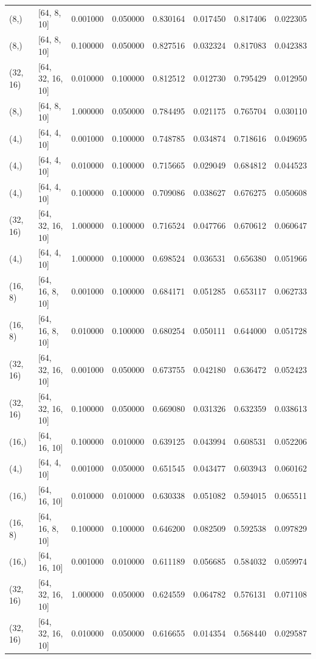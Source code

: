 \documentclass{article}
\begin{document}
\begin{longtable}{llrrrrrr}
(8,) & [64, 8, 10] & 0.001000 & 0.050000 & 0.830164 & 0.017450 & 0.817406 & 0.022305 \\
(8,) & [64, 8, 10] & 0.100000 & 0.050000 & 0.827516 & 0.032324 & 0.817083 & 0.042383 \\
(32, 16) & [64, 32, 16, 10] & 0.010000 & 0.100000 & 0.812512 & 0.012730 & 0.795429 & 0.012950 \\
(8,) & [64, 8, 10] & 1.000000 & 0.050000 & 0.784495 & 0.021175 & 0.765704 & 0.030110 \\
(4,) & [64, 4, 10] & 0.001000 & 0.100000 & 0.748785 & 0.034874 & 0.718616 & 0.049695 \\
(4,) & [64, 4, 10] & 0.010000 & 0.100000 & 0.715665 & 0.029049 & 0.684812 & 0.044523 \\
(4,) & [64, 4, 10] & 0.100000 & 0.100000 & 0.709086 & 0.038627 & 0.676275 & 0.050608 \\
(32, 16) & [64, 32, 16, 10] & 1.000000 & 0.100000 & 0.716524 & 0.047766 & 0.670612 & 0.060647 \\
(4,) & [64, 4, 10] & 1.000000 & 0.100000 & 0.698524 & 0.036531 & 0.656380 & 0.051966 \\
(16, 8) & [64, 16, 8, 10] & 0.001000 & 0.100000 & 0.684171 & 0.051285 & 0.653117 & 0.062733 \\
(16, 8) & [64, 16, 8, 10] & 0.010000 & 0.100000 & 0.680254 & 0.050111 & 0.644000 & 0.051728 \\
(32, 16) & [64, 32, 16, 10] & 0.001000 & 0.050000 & 0.673755 & 0.042180 & 0.636472 & 0.052423 \\
(32, 16) & [64, 32, 16, 10] & 0.100000 & 0.050000 & 0.669080 & 0.031326 & 0.632359 & 0.038613 \\
(16,) & [64, 16, 10] & 0.100000 & 0.010000 & 0.639125 & 0.043994 & 0.608531 & 0.052206 \\
(4,) & [64, 4, 10] & 0.001000 & 0.050000 & 0.651545 & 0.043477 & 0.603943 & 0.060162 \\
(16,) & [64, 16, 10] & 0.010000 & 0.010000 & 0.630338 & 0.051082 & 0.594015 & 0.065511 \\
(16, 8) & [64, 16, 8, 10] & 0.100000 & 0.100000 & 0.646200 & 0.082509 & 0.592538 & 0.097829 \\
(16,) & [64, 16, 10] & 0.001000 & 0.010000 & 0.611189 & 0.056685 & 0.584032 & 0.059974 \\
(32, 16) & [64, 32, 16, 10] & 1.000000 & 0.050000 & 0.624559 & 0.064782 & 0.576131 & 0.071108 \\
(32, 16) & [64, 32, 16, 10] & 0.010000 & 0.050000 & 0.616655 & 0.014354 & 0.568440 & 0.029587 \\

\end{longtable}
\end{document}
